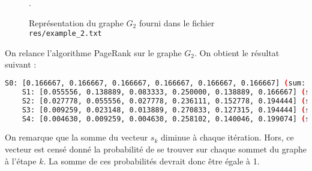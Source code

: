\begin{figure}
    \centering
    \caption{Représentation du graphe $G_2$ fourni dans le fichier \texttt{res/example\_2.txt}}.
    \label{fig:graph_g2}
\end{figure}

On relance l'algorithme PageRank sur le graphe $G_2$. On obtient le résultat suivant :

\begin{minipage}{\dimexpr\linewidth-20pt}
    \begin{lstlisting}[language=bash, caption={Résultat de l'algorithme PageRank sur le graphe $G_2$ fourni, pour $k = 4$, avec la somme des valeurs du vecteur $s_k$ à chaque itération $k$.}]
    S0: [0.166667, 0.166667, 0.166667, 0.166667, 0.166667, 0.166667] (sum: 1.000000)
    S1: [0.055556, 0.138889, 0.083333, 0.250000, 0.138889, 0.166667] (sum: 0.833333)
    S2: [0.027778, 0.055556, 0.027778, 0.236111, 0.152778, 0.194444] (sum: 0.694444)
    S3: [0.009259, 0.023148, 0.013889, 0.270833, 0.127315, 0.194444] (sum: 0.638889)
    S4: [0.004630, 0.009259, 0.004630, 0.258102, 0.140046, 0.199074] (sum: 0.615741)
    \end{lstlisting}
\end{minipage}

On remarque que la somme du vecteur $s_k$ diminue à chaque itération. Hors, ce vecteur est censé donné la probabilité de se trouver sur chaque sommet du graphe à l'étape $k$. La somme de ces probabilités devrait donc être égale à 1.
